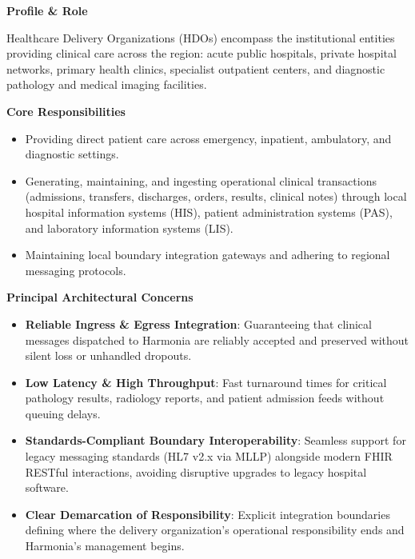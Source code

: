 \par\medskip\textbf{Profile \& Role}\par


Healthcare Delivery Organizations (HDOs) encompass the institutional entities providing clinical care across the region: acute public hospitals, private hospital networks, primary health clinics, specialist outpatient centers, and diagnostic pathology and medical imaging facilities.



\par\medskip\textbf{Core Responsibilities}\par


\begin{itemize}


\item Providing direct patient care across emergency, inpatient, ambulatory, and diagnostic settings.

\item Generating, maintaining, and ingesting operational clinical transactions (admissions, transfers, discharges, orders, results, clinical notes) through local hospital information systems (HIS), patient administration systems (PAS), and laboratory information systems (LIS).

\item Maintaining local boundary integration gateways and adhering to regional messaging protocols.

\end{itemize}


\par\medskip\textbf{Principal Architectural Concerns}\par


\begin{itemize}


\item \textbf{Reliable Ingress \& Egress Integration}: Guaranteeing that clinical messages dispatched to Harmonia are reliably accepted and preserved without silent loss or unhandled dropouts.

\item \textbf{Low Latency \& High Throughput}: Fast turnaround times for critical pathology results, radiology reports, and patient admission feeds without queuing delays.

\item \textbf{Standards-Compliant Boundary Interoperability}: Seamless support for legacy messaging standards (HL7 v2.x via MLLP) alongside modern FHIR RESTful interactions, avoiding disruptive upgrades to legacy hospital software.

\item \textbf{Clear Demarcation of Responsibility}: Explicit integration boundaries defining where the delivery organization's operational responsibility ends and Harmonia's management begins.

\end{itemize}

